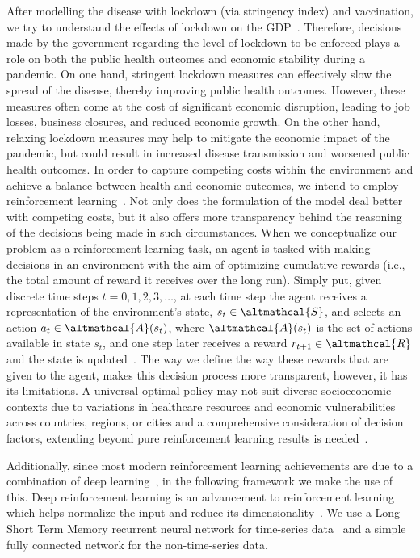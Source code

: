 \documentclass[tikz,fleqn,12pt]{wlscirep}
\begin{document}
After modelling the disease with lockdown (via stringency index) and vaccination, we try to understand the effects of lockdown on the GDP~\cite{StringencyEconomicDecline,Cilloni2020,Arinaminpathy2010}. Therefore, decisions made by the government regarding the level of lockdown to be enforced plays a role on both the public health outcomes and economic stability during a pandemic. On one hand, stringent lockdown measures can effectively slow the spread of the disease, thereby improving public health outcomes. However, these measures often come at the cost of significant economic disruption, leading to job losses, business closures, and reduced economic growth. On the other hand, relaxing lockdown measures may help to mitigate the economic impact of the pandemic, but could result in increased disease transmission and worsened public health outcomes. In order to capture competing costs within the environment and achieve a balance between health and economic outcomes, we intend to employ reinforcement learning~\cite{Nguyen2022,Bastani2021,Song2022,Ohi2020,PADMANABHAN2021102676}. Not only does the formulation of the model deal better with competing costs, but it also offers more transparency behind the reasoning of the decisions being made in such circumstances. When we conceptualize our problem as a reinforcement learning task, an agent is tasked with making decisions in an environment with the aim of optimizing cumulative rewards (i.e., the total amount of reward it receives over the long run). Simply put, given discrete time steps $t = 0, 1, 2, 3, \dots$, at each time step the agent receives a representation of the environment's state, $s_t \in \altmathcal{S}$, and selects an action $a_t \in \altmathcal{A}(s_t)$, where $\altmathcal{A}(s_t)$ is the set of actions available in state $s_t$, and one step later receives a reward $r_{t+1} \in \altmathcal{R}$ and the state is updated~\cite{sutton2018reinforcement}. The way we define the way these rewards that are given to the agent, makes this decision process more transparent, however, it has its limitations. A universal optimal policy may not suit diverse socioeconomic contexts due to variations in healthcare resources and economic vulnerabilities across countries, regions, or cities and a comprehensive consideration of decision factors, extending beyond pure reinforcement learning results is needed~\cite{Song2022,Dunn2017,Demir2006}.

Additionally, since most modern reinforcement learning achievements are due to a combination of deep learning~\cite{Mnih2015}, in the following framework we make the use of this. Deep reinforcement learning is an advancement to reinforcement learning which helps normalize the input and reduce its dimensionality~\cite{Lavet2018,Arulkumaran2017,Henderson_Islam_Bachman_Pineau_Precup_Meger_2018,Mnih2015}. We use a Long Short Term Memory recurrent neural network for time-series data~\cite{NIPS2001_a38b1617,LSTM} and a simple fully connected network for the non-time-series data.
\end{document}
